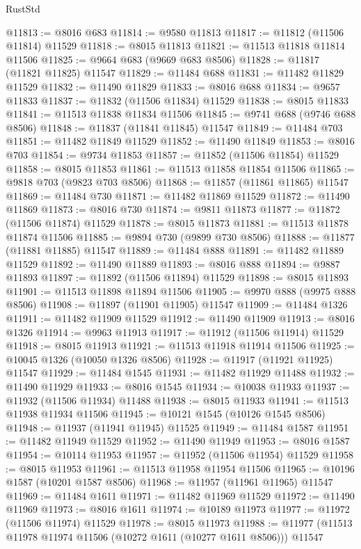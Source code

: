 \begin{lexlean}{RustStd}
\begin{coremodule}
@11813 := @8016 @683
@11814 := @9580 @11813
@11817 := @11812 (@11506 @11814) @11529
@11818 := @8015 @11813
@11821 := @11513 @11818 @11814 @11506
@11825 := @9664 @683 (@9669 @683 @8506)
@11828 := @11817 (@11821 @11825) @11547
@11829 := @11484 @688
@11831 := @11482 @11829 @11529
@11832 := @11490 @11829
@11833 := @8016 @688
@11834 := @9657 @11833
@11837 := @11832 (@11506 @11834) @11529
@11838 := @8015 @11833
@11841 := @11513 @11838 @11834 @11506
@11845 := @9741 @688 (@9746 @688 @8506)
@11848 := @11837 (@11841 @11845) @11547
@11849 := @11484 @703
@11851 := @11482 @11849 @11529
@11852 := @11490 @11849
@11853 := @8016 @703
@11854 := @9734 @11853
@11857 := @11852 (@11506 @11854) @11529
@11858 := @8015 @11853
@11861 := @11513 @11858 @11854 @11506
@11865 := @9818 @703 (@9823 @703 @8506)
@11868 := @11857 (@11861 @11865) @11547
@11869 := @11484 @730
@11871 := @11482 @11869 @11529
@11872 := @11490 @11869
@11873 := @8016 @730
@11874 := @9811 @11873
@11877 := @11872 (@11506 @11874) @11529
@11878 := @8015 @11873
@11881 := @11513 @11878 @11874 @11506
@11885 := @9894 @730 (@9899 @730 @8506)
@11888 := @11877 (@11881 @11885) @11547
@11889 := @11484 @888
@11891 := @11482 @11889 @11529
@11892 := @11490 @11889
@11893 := @8016 @888
@11894 := @9887 @11893
@11897 := @11892 (@11506 @11894) @11529
@11898 := @8015 @11893
@11901 := @11513 @11898 @11894 @11506
@11905 := @9970 @888 (@9975 @888 @8506)
@11908 := @11897 (@11901 @11905) @11547
@11909 := @11484 @1326
@11911 := @11482 @11909 @11529
@11912 := @11490 @11909
@11913 := @8016 @1326
@11914 := @9963 @11913
@11917 := @11912 (@11506 @11914) @11529
@11918 := @8015 @11913
@11921 := @11513 @11918 @11914 @11506
@11925 := @10045 @1326 (@10050 @1326 @8506)
@11928 := @11917 (@11921 @11925) @11547
@11929 := @11484 @1545
@11931 := @11482 @11929 @11488
@11932 := @11490 @11929
@11933 := @8016 @1545
@11934 := @10038 @11933
@11937 := @11932 (@11506 @11934) @11488
@11938 := @8015 @11933
@11941 := @11513 @11938 @11934 @11506
@11945 := @10121 @1545 (@10126 @1545 @8506)
@11948 := @11937 (@11941 @11945) @11525
@11949 := @11484 @1587
@11951 := @11482 @11949 @11529
@11952 := @11490 @11949
@11953 := @8016 @1587
@11954 := @10114 @11953
@11957 := @11952 (@11506 @11954) @11529
@11958 := @8015 @11953
@11961 := @11513 @11958 @11954 @11506
@11965 := @10196 @1587 (@10201 @1587 @8506)
@11968 := @11957 (@11961 @11965) @11547
@11969 := @11484 @1611
@11971 := @11482 @11969 @11529
@11972 := @11490 @11969
@11973 := @8016 @1611
@11974 := @10189 @11973
@11977 := @11972 (@11506 @11974) @11529
@11978 := @8015 @11973
@11988 := @11977 (@11513 @11978 @11974 @11506 (@10272 @1611 (@10277 @1611 @8506))) @11547

\end{coremodule}
\end{lexlean}
